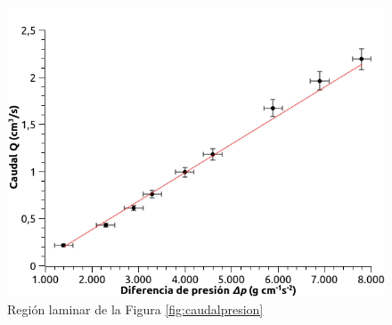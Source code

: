 \documentclass[a4paper,12pt,spanish]{article}
\begin{document}
	

	
	\begin{figure}[H]
		\centering
		\includegraphics[width=0.7\linewidth]{graficas/caudal_laminar}
		\caption{Región laminar de la Figura \ref{fig:caudalpresion}}
		\label{fig:caudallaminar}
	\end{figure}
	
\end{document}
